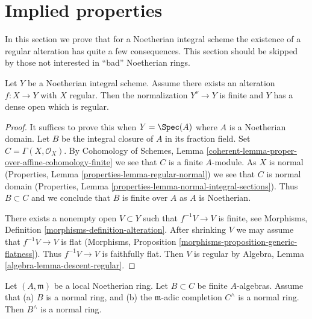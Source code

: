 \section{Implied properties}
\label{section-existence-gives}

\noindent
In this section we prove that for a Noetherian integral scheme
the existence of a regular alteration has quite a few consequences.
This section should be skipped by those not interested in
``bad'' Noetherian rings.

\begin{lemma}
\label{lemma-regular-alteration-implies}
Let $Y$ be a Noetherian integral scheme. Assume there exists an alteration
$f : X \to Y$ with $X$ regular. Then the normalization $Y^\nu \to Y$
is finite and $Y$ has a dense open which is regular.
\end{lemma}

\begin{proof}
It suffices to prove this when $Y = \Spec(A)$ where $A$ is a Noetherian domain.
Let $B$ be the integral closure of $A$ in its fraction field.
Set $C = \Gamma(X, \mathcal{O}_X)$. By
Cohomology of Schemes, Lemma
\ref{coherent-lemma-proper-over-affine-cohomology-finite}
we see that $C$ is a finite $A$-module. As $X$ is normal
(Properties, Lemma \ref{properties-lemma-regular-normal})
we see that $C$ is normal domain
(Properties, Lemma \ref{properties-lemma-normal-integral-sections}).
Thus $B \subset C$ and we conclude that $B$ is finite over $A$
as $A$ is Noetherian.

\medskip\noindent
There exists a nonempty open $V \subset Y$ such that $f^{-1}V \to V$
is finite, see Morphisms, Definition \ref{morphisms-definition-alteration}.
After shrinking $V$ we may assume that $f^{-1}V \to V$ is flat
(Morphisms, Proposition \ref{morphisms-proposition-generic-flatness}).
Thus $f^{-1}V \to V$ is faithfully flat. Then $V$ is regular by
Algebra, Lemma \ref{algebra-lemma-descent-regular}.
\end{proof}

\begin{lemma}
\label{lemma-algebra-helper}
Let $(A, \mathfrak m)$ be a local Noetherian ring. Let $B \subset C$
be finite $A$-algebras. Assume that (a) $B$ is a normal ring, and
(b) the $\mathfrak m$-adic completion $C^\wedge$ is a normal ring.
Then $B^\wedge$ is a normal ring.
\end{lemma}


